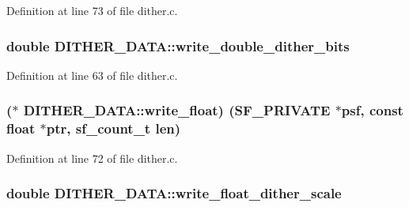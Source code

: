 Definition at line 73 of file dither.\+c.

\subsubsection[{\texorpdfstring{write\+\_\+double\+\_\+dither\+\_\+bits}{write_double_dither_bits}}]{\setlength{\rightskip}{0pt plus 5cm}double D\+I\+T\+H\+E\+R\+\_\+\+D\+A\+T\+A\+::write\+\_\+double\+\_\+dither\+\_\+bits}\hypertarget{struct_d_i_t_h_e_r___d_a_t_a_a13d706b61693f24543f37868f928b027}{}\label{struct_d_i_t_h_e_r___d_a_t_a_a13d706b61693f24543f37868f928b027}


Definition at line 63 of file dither.\+c.

\subsubsection[{\texorpdfstring{write\+\_\+float}{write_float}}]{($\ast$ D\+I\+T\+H\+E\+R\+\_\+\+D\+A\+T\+A\+::write\+\_\+float) ({\bf S\+F\+\_\+\+P\+R\+I\+V\+A\+TE} $\ast$psf, {\bf const} float $\ast$ptr, {\bf sf\+\_\+count\+\_\+t} {\bf len})}\hypertarget{struct_d_i_t_h_e_r___d_a_t_a_adb6bf69a5a84eed2602efdc6bd8d5b16}{}\label{struct_d_i_t_h_e_r___d_a_t_a_adb6bf69a5a84eed2602efdc6bd8d5b16}


Definition at line 72 of file dither.\+c.

\subsubsection[{\texorpdfstring{write\+\_\+float\+\_\+dither\+\_\+scale}{write_float_dither_scale}}]{\setlength{\rightskip}{0pt plus 5cm}double D\+I\+T\+H\+E\+R\+\_\+\+D\+A\+T\+A\+::write\+\_\+float\+\_\+dither\+\_\+scale}\hypertarget{struct_d_i_t_h_e_r___d_a_t_a_a86aec83a13b1a67860a9ccaec0ecb982}{}\label{struct_d_i_t_h_e_r___d_a_t_a_a86aec83a13b1a67860a9ccaec0ecb982}


